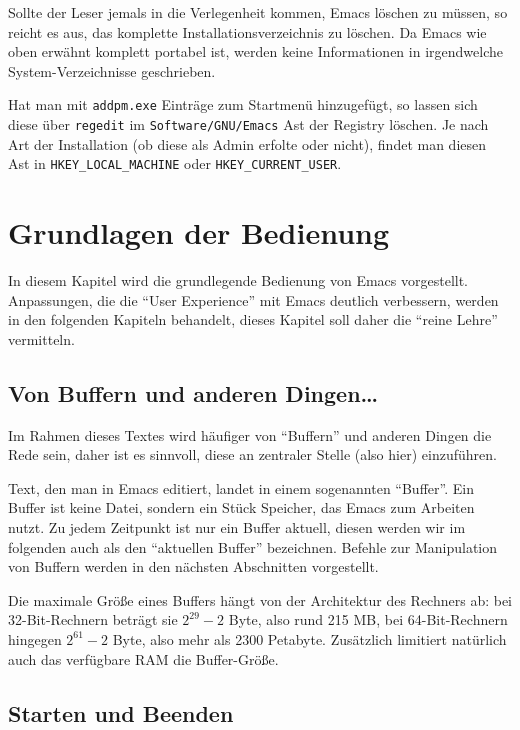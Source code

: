 \documentclass[12pt,ngerman]{scrbook}
\begin{document}
Sollte der Leser jemals in die Verlegenheit kommen, Emacs löschen zu müssen, so reicht es aus, das komplette Installationsverzeichnis zu löschen. Da Emacs wie oben erwähnt komplett portabel ist, werden keine Informationen in irgendwelche System-Verzeichnisse geschrieben.

Hat man mit \texttt{addpm.exe} Einträge zum Startmenü hinzugefügt, so lassen sich diese über \texttt{regedit} im \texttt{Software/GNU/Emacs} Ast der Registry löschen. 
Je nach Art der Installation (ob diese als Admin erfolte oder nicht), findet man diesen Ast in \verb|HKEY_LOCAL_MACHINE| oder \verb|HKEY_CURRENT_USER|.


\chapter{Grundlagen der Bedienung}

In diesem Kapitel wird die grundlegende Bedienung von Emacs vorgestellt. 
Anpassungen, die die \enquote{User Experience} mit Emacs deutlich verbessern, werden in den folgenden Kapiteln behandelt, dieses Kapitel soll daher die \enquote{reine Lehre} vermitteln.

\section{Von Buffern und anderen Dingen\ldots}

Im Rahmen dieses Textes wird häufiger von \enquote{Buffern} und anderen Dingen die Rede sein, daher ist es sinnvoll, diese an zentraler Stelle (also hier) einzuführen.

Text, den man in Emacs editiert, landet in einem sogenannten \enquote{Buffer}. Ein Buffer ist keine Datei, sondern ein Stück Speicher, das Emacs zum Arbeiten nutzt. Zu jedem Zeitpunkt ist nur ein Buffer aktuell, diesen werden wir im folgenden auch als den \enquote{aktuellen Buffer} bezeichnen. Befehle zur Manipulation von Buffern werden in den nächsten Abschnitten vorgestellt.

Die maximale Größe eines Buffers hängt von der Architektur des Rechners ab: bei 32-Bit-Rechnern beträgt sie $2^29 - 2$ Byte, also rund 215 MB, bei 64-Bit-Rechnern hingegen $2^61-2$ Byte, also mehr als 2300 Petabyte. Zusätzlich limitiert natürlich auch das verfügbare RAM die Buffer-Größe.

\section{Starten und Beenden}
\end{document}
